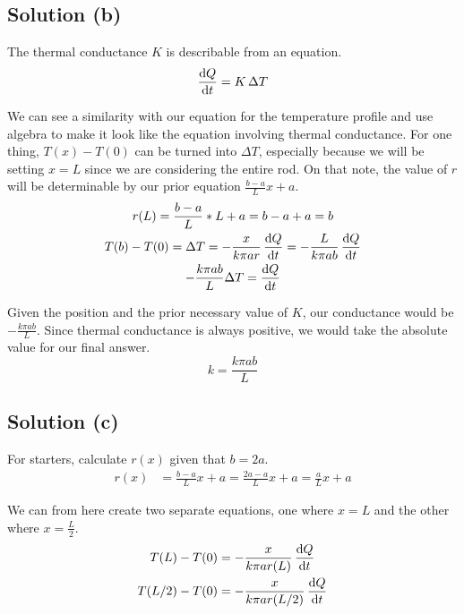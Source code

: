 \documentclass[12pt]{article}
\begin{document}
        \subsection{Solution (b)}
            The thermal conductance $K$ is describable from an equation.
            \begin{gather}
                \dv{Q}{t}   =   K\,\Delta T
            \end{gather}

            We can see a similarity with our equation for the temperature profile and use algebra to make it look like the equation involving thermal conductance.
            For one thing, $T(x) - T(0)$ can be turned into $\Delta T$, especially because we will be setting $x = L$ since we are considering the entire rod.
            On that note, the value of $r$ will be determinable by our prior equation $\frac{b - a}{L}x + a$. 
            \begin{gather}
                r(L)    =   \frac{b - a}{L} * L + a
                    =   b - a + a
                    =   b\\
                T(b) - T(0) =   \Delta T
                    =   -\frac{x}{k \pi ar}\,\dv{Q}{t}
                    =   -\frac{L}{k \pi ab}\,\dv{Q}{t}\\
                -\frac{k \pi ab}{L}\Delta T =   \dv{Q}{t}
            \end{gather}

            Given the position and the prior necessary value of $K$, our conductance would be $-\frac{k \pi ab}{L}$.
            Since thermal conductance is always positive, we would take the absolute value for our final answer.
            \begin{equation}
                \boxed{k = \frac{k \pi ab}{L}}
            \end{equation}
        
        \subsection{Solution (c)}
            For starters, calculate $r(x)$ given that $b = 2a$.
            \begin{align}
                r(x)    &=  \frac{b - a}{L}x + a
                    =   \frac{2a - a}{L}x + a
                    =   \frac{a}{L}x + a
            \end{align}

            We can from here create two separate equations, one where $x = L$ and the other where $x = \frac{L}{2}$.
            \begin{gather}
                T(L) - T(0) =   -\frac{x}{k \pi ar(L)}\,\dv{Q}{t}\\
                T(L/2) - T(0)   =   -\frac{x}{k \pi ar(L/2)}\,\dv{Q}{t}
            \end{gather}
\end{document}
